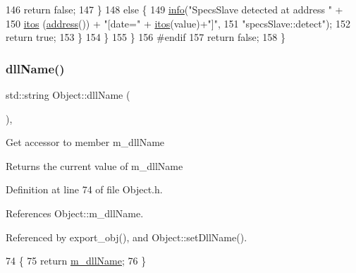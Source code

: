 \begin{DoxyCode}
146         \textcolor{keywordflow}{return} \textcolor{keyword}{false};
147       \}
148       \textcolor{keywordflow}{else} \{
149         \hyperlink{classObject_a644fd329ea4cb85f54fa6846484b84a8}{info}(\textcolor{stringliteral}{"SpecsSlave detected at address "} + 
150              \hyperlink{Tools_8h_af330027dbdafb9a30768b3613c553e60}{itos} (\hyperlink{classSpecsInterface_a0fa039a15b842a5ba783ce825b9915d8}{address}()) + \textcolor{stringliteral}{"[date="} + \hyperlink{Tools_8h_af330027dbdafb9a30768b3613c553e60}{itos}(value)+\textcolor{stringliteral}{"]"},
151              \textcolor{stringliteral}{"specsSlave::detect"});
152         \textcolor{keywordflow}{return} \textcolor{keyword}{true};
153       \}
154     \}    
155   \}
156 \textcolor{preprocessor}{#endif
}
157   \textcolor{keywordflow}{return} \textcolor{keyword}{false};
158 \}
\end{DoxyCode}
\mbox{\label{classObject_a2e3947f2870094c332d7454117f3ec63}} 
\subsubsection{\texorpdfstring{dll\+Name()}{dllName()}}
{\footnotesize\ttfamily std\+::string Object\+::dll\+Name (\begin{DoxyParamCaption}{ }\end{DoxyParamCaption})\hspace{0.3cm}{\ttfamily [inline]}, {\ttfamily [inherited]}}

Get accessor to member m\+\_\+dll\+Name \begin{DoxyReturn}{Returns}
the current value of m\+\_\+dll\+Name 
\end{DoxyReturn}


Definition at line 74 of file Object.\+h.



References Object\+::m\+\_\+dll\+Name.



Referenced by export\+\_\+obj(), and Object\+::set\+Dll\+Name().


\begin{DoxyCode}
74                        \{
75     \textcolor{keywordflow}{return} \hyperlink{classObject_a01afbeacebb8db6831559972ec362eb3}{m\_dllName};
76   \}  
\end{DoxyCode}
\mbox{\label{classObject_a204a95f57818c0f811933917a30eff45}} 
